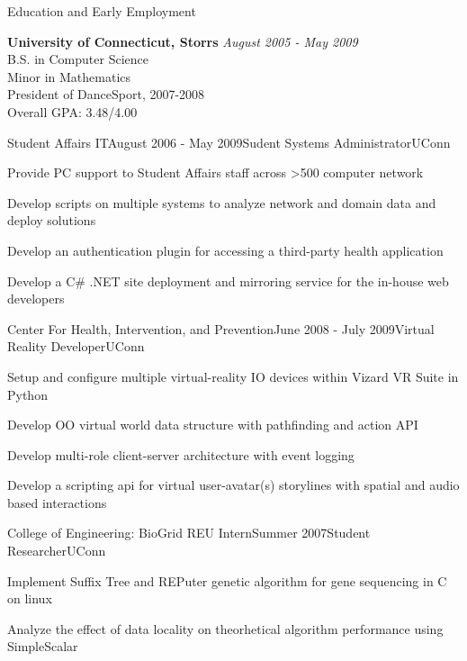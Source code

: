 \documentclass{resume} %
\begin{document}
\begin{rSection}{Education and Early Employment}

{\bf University of Connecticut, Storrs} \hfill {\em August 2005 - May 2009} \\ 
B.S. in Computer Science \\
Minor in Mathematics \smallskip \\
President of DanceSport, 2007-2008 \\
Overall GPA: 3.48/4.00 

\begin{rSubsection}{Student Affairs IT}{August 2006 - May 2009}{Sudent Systems Administrator}{UConn}
\setlength{\itemindent}{1em}
\item Provide PC support to Student Affairs staff across \textgreater500 computer network
\item Develop scripts on multiple systems to analyze network and domain data and deploy solutions
\item Develop an authentication plugin for accessing a third-party health application
\item Develop a C\# .NET site deployment and mirroring service for the in-house web developers
\end{rSubsection}

\begin{rSubsection}{Center For Health, Intervention, and Prevention}{June 2008 - July 2009}{Virtual Reality Developer}{UConn}
\setlength{\itemindent}{1em}
\item Setup and configure multiple virtual-reality IO devices within Vizard VR Suite in Python
\item Develop OO virtual world data structure with pathfinding and action API
\item Develop multi-role client-server architecture with event logging
\item Develop a scripting api for virtual user-avatar(s) storylines with spatial and audio based interactions
\end{rSubsection}

\begin{rSubsection}{College of Engineering: BioGrid REU Intern}{Summer 2007}{Student Researcher}{UConn}
\setlength{\itemindent}{1em}
\item Implement Suffix Tree and REPuter genetic algorithm for gene sequencing in C on linux
\item Analyze the effect of data locality on theorhetical algorithm performance using SimpleScalar
\end{rSubsection}


\end{rSection}
\end{document}

